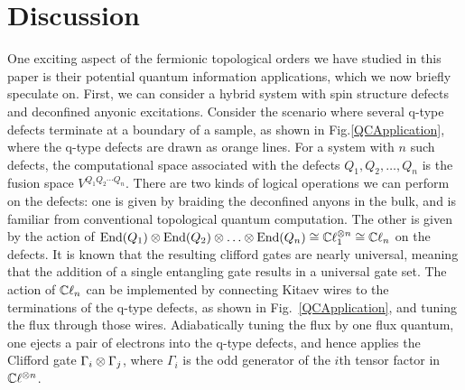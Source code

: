 
\section{Discussion} \label{discussion}


One exciting aspect of the fermionic topological orders we have studied in this paper is their potential quantum information 
applications, which we now briefly speculate on. 
First, we can consider a hybrid system with spin structure defects and deconfined anyonic excitations.
Consider the scenario where several q-type defects terminate at a boundary of a sample, as shown in Fig.\ref{QCApplication}, where the q-type defects are drawn as orange lines.
For a system with $n$ such defects,  
the computational space associated with the defects $Q_1,Q_2,\dots,Q_n$ is the fusion space $V^{Q_1 Q_2 \cdots Q_n}$. 
There are two kinds of logical operations we can perform on the defects:
one is given by braiding the deconfined anyons in the bulk, and is familiar from conventional topological quantum computation.
The other is given by the action of $\End(Q_1)\tp\End(Q_2)\tp\dots\tp\End(Q_n)\cong\cliff_1^{\tp n} \cong \cliff_n$ on the defects.
It is known that the resulting clifford gates are nearly universal, meaning that the addition of a single entangling gate results in a universal gate set.
The action of $\mathbb{C}\ell_n$ can be implemented by connecting Kitaev wires to the terminations of the q-type defects, as shown in Fig.~\ref{QCApplication}, and tuning the flux through those wires. 
Adiabatically tuning the flux by one flux quantum, one ejects a pair of electrons into the q-type defects, and hence applies the Clifford gate $\Gamma_i \otimes \Gamma_j$, where $\Gamma_i$ is the odd generator 
of the $i$th tensor factor in $\mathbb{C}\ell^{\otimes n}$.

